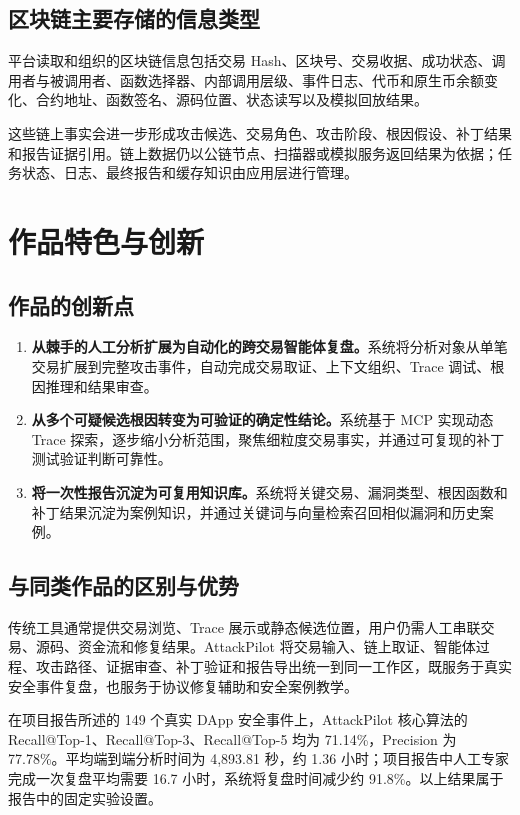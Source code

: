 \documentclass[UTF8,a4paper,12pt]{ctexart}
\begin{document}
\subsection{区块链主要存储的信息类型}

平台读取和组织的区块链信息包括交易 Hash、区块号、交易收据、成功状态、调用者与被调用者、函数选择器、内部调用层级、事件日志、代币和原生币余额变化、合约地址、函数签名、源码位置、状态读写以及模拟回放结果。\par

这些链上事实会进一步形成攻击候选、交易角色、攻击阶段、根因假设、补丁结果和报告证据引用。链上数据仍以公链节点、扫描器或模拟服务返回结果为依据；任务状态、日志、最终报告和缓存知识由应用层进行管理。

\section{作品特色与创新}

\subsection{作品的创新点}

\begin{enumerate}[leftmargin=2.8em]
  \item \textbf{从棘手的人工分析扩展为自动化的跨交易智能体复盘。}系统将分析对象从单笔交易扩展到完整攻击事件，自动完成交易取证、上下文组织、Trace 调试、根因推理和结果审查。
  \item \textbf{从多个可疑候选根因转变为可验证的确定性结论。}系统基于 MCP 实现动态 Trace 探索，逐步缩小分析范围，聚焦细粒度交易事实，并通过可复现的补丁测试验证判断可靠性。
  \item \textbf{将一次性报告沉淀为可复用知识库。}系统将关键交易、漏洞类型、根因函数和补丁结果沉淀为案例知识，并通过关键词与向量检索召回相似漏洞和历史案例。
\end{enumerate}

\subsection{与同类作品的区别与优势}

传统工具通常提供交易浏览、Trace 展示或静态候选位置，用户仍需人工串联交易、源码、资金流和修复结果。AttackPilot 将交易输入、链上取证、智能体过程、攻击路径、证据审查、补丁验证和报告导出统一到同一工作区，既服务于真实安全事件复盘，也服务于协议修复辅助和安全案例教学。\par

在项目报告所述的 149 个真实 DApp 安全事件上，AttackPilot 核心算法的 Recall@Top-1、Recall@Top-3、Recall@Top-5 均为 71.14\%，Precision 为 77.78\%。平均端到端分析时间为 4,893.81 秒，约 1.36 小时；项目报告中人工专家完成一次复盘平均需要 16.7 小时，系统将复盘时间减少约 91.8\%。以上结果属于报告中的固定实验设置。
\end{document}
